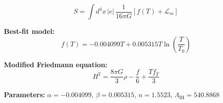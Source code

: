 
\begin{equation}
  S = \int d^4x \, |e| \, \frac{1}{16\pi G} \left[ f(T) + \mathcal{L}_m \right]
\end{equation}

\textbf{Best-fit model:}
\begin{equation}
  f(T) = -0.004099 T + 0.005315 T \ln\!\left(\frac{T}{T_0}\right)
\end{equation}

\textbf{Modified Friedmann equation:}
\begin{equation}
  H^2 = \frac{8\pi G}{3} \rho - \frac{f}{6} + \frac{T f_T}{3}
\end{equation}

\textbf{Parameters:}
$\alpha = -0.004099$, \quad
$\beta = 0.005315$, \quad
$n = 1.5523$, \quad
$\Lambda_{\text{BI}} = 540.8868$